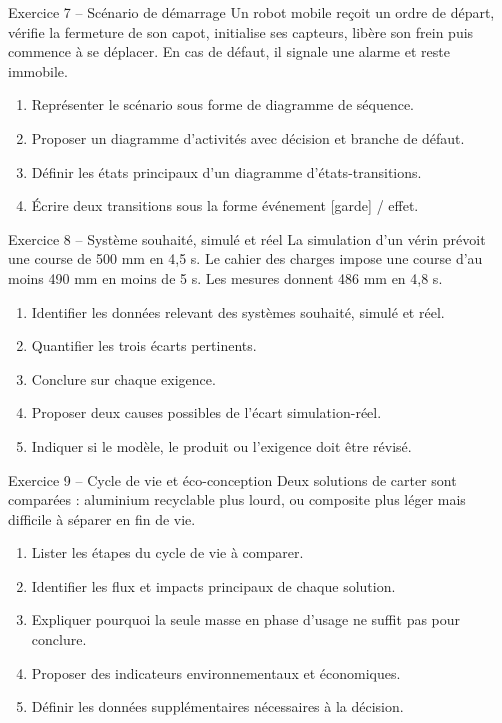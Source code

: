 \begin{TLExercise}{Exercice 7 -- Scénario de démarrage}
Un robot mobile reçoit un ordre de départ, vérifie la fermeture de son capot, initialise ses capteurs, libère son frein puis commence à se déplacer. En cas de défaut, il signale une alarme et reste immobile.
\begin{enumerate}
  \item Représenter le scénario sous forme de diagramme de séquence.
  \item Proposer un diagramme d'activités avec décision et branche de défaut.
  \item Définir les états principaux d'un diagramme d'états-transitions.
  \item Écrire deux transitions sous la forme événement [garde] / effet.
\end{enumerate}
\end{TLExercise}

\begin{TLExercise}{Exercice 8 -- Système souhaité, simulé et réel}
La simulation d'un vérin prévoit une course de 500 mm en 4,5 s. Le cahier des charges impose une course d'au moins 490 mm en moins de 5 s. Les mesures donnent 486 mm en 4,8 s.
\begin{enumerate}
  \item Identifier les données relevant des systèmes souhaité, simulé et réel.
  \item Quantifier les trois écarts pertinents.
  \item Conclure sur chaque exigence.
  \item Proposer deux causes possibles de l'écart simulation-réel.
  \item Indiquer si le modèle, le produit ou l'exigence doit être révisé.
\end{enumerate}
\end{TLExercise}

\begin{TLExercise}{Exercice 9 -- Cycle de vie et éco-conception}
Deux solutions de carter sont comparées : aluminium recyclable plus lourd, ou composite plus léger mais difficile à séparer en fin de vie.
\begin{enumerate}
  \item Lister les étapes du cycle de vie à comparer.
  \item Identifier les flux et impacts principaux de chaque solution.
  \item Expliquer pourquoi la seule masse en phase d'usage ne suffit pas pour conclure.
  \item Proposer des indicateurs environnementaux et économiques.
  \item Définir les données supplémentaires nécessaires à la décision.
\end{enumerate}
\end{TLExercise}

